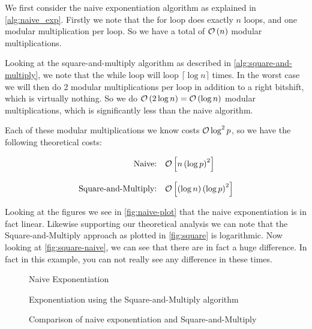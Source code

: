 We first consider the naive exponentiation algorithm as explained in \autoref{alg:naive_exp}.
Firstly we note that the for loop does exactly $n$ loops, and one modular multiplication per loop.
So we have a total of $\mathcal{O} \left( n \right)$ modular multiplications.

Looking at the square-and-multiply algorithm as described in \autoref{alg:square-and-multiply}, we note that the while loop will loop $\lceil \log n \rceil$ times.
In the worst case we will then do 2 modular multiplications per loop in addition to a right bitshift, which is virtually nothing.
So we do $\mathcal{O} \left( 2\log n \right) = \mathcal{O} \left(  \log n  \right)$ modular multiplications, which is significantly less than the naive algorithm.

Each of these modular multiplications we know costs $\mathcal{O} \log^2 p$, so we have the following theoretical costs:

\begin{equation}
  \label{ref:costs}
  \begin{array}{rl}
    \text{Naive:} & \mathcal{O} \left[  n \left( \log p \right)^2  \right] \\
    \\
    \text{Square-and-Multiply:} & \mathcal{O} \left[  \left(  \log n  \right) \left(  \log p  \right)^2  \right]
  \end{array}
\end{equation}

Looking at the figures we see in \autoref{fig:naive-plot} that the naive exponentiation is in fact linear.
Likewise supporting our theoretical analysis we can note that the Square-and-Multiply approach as plotted in \autoref{fig:square} is logarithmic.
Now looking at \autoref{fig:square-naive}, we can see that there are in fact a huge difference.
In fact in this example, you can not really see any difference in these times.


\begin{figure}
  \begin{center}
    
  \end{center}
  \caption{Naive Exponentiation}\label{fig:naive-plot}
\end{figure}

\begin{figure}
  \begin{center}
    
  \end{center}
  \caption{Exponentiation using the Square-and-Multiply algorithm}\label{fig:square}
\end{figure}

\begin{figure}
  \begin{center}
    
  \end{center}
  \caption{Comparison of naive exponentiation and Square-and-Multiply}\label{fig:square-naive}
\end{figure}


